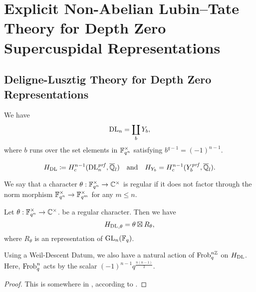 \documentclass[../main.tex]{subfiles}
\begin{document}
\section{Explicit Non-Abelian Lubin--Tate Theory for Depth Zero Supercuspidal
Representations} %
\label{sec:Explicit Non-Abelian Lubin-Tate Theory for Depth Zero Supercuspidal Representations}


\subsection{Deligne-Lusztig Theory for Depth Zero Representations} %
\label{sub:Deligne-Lusztig Theory for Depth Zero Representations}
\begin{defi}\label{def:DLVariety}
  \todo{}
\end{defi}

\begin{lem}
  We have $$\mathrm{DL}_n = \coprod_{b} Y_b,$$
  where $b$ runs over the set elements in $\mathbb{F}_{q^n}^\times$ satisfying 
  $b^{q-1} = (-1)^{n-1}$. 
\end{lem}

\begin{equation} \label{eq:defDLCohom}
  H_\mathrm{DL} \coloneqq H^{n-1}_c(\mathrm{DL}_n^{\mathit{prf}}, \overline {\mathbb{Q}}_l) \quad \text{and} \quad
  H_{Y_b} = H^{n-1}_c(Y_b^{\mathit{prf}}, \overline {\mathbb{Q}}_l).
\end{equation}

\begin{defi}
  We say that a character $\theta: \mathbb{F}_{q^n}^\times \to \mathbb{C}^\times$ is 
  regular if it does not factor through the norm morphism
  $\mathbb{F}_{q^n}^\times \to \mathbb{F}_{q^m}^\times$ for any $m \leq n$.
\end{defi}

\begin{defi} \label{def:DLCorrespondence}
  Let $\theta: \mathbb{F}_{q^n}^\times \to \mathbb{C}^\times$. be a regular character.
  Then we have 
  \begin{equation*}
    {H_\mathrm{DL}}_{, \theta} = \theta \boxtimes R_\theta,
  \end{equation*}
  where $R_\theta$ is an  representation of $\operatorname{GL}_n(\mathbb{F}_q)$. 
\end{defi}

\begin{prop}
  Using a  Weil-Descent Datum, we also have a natural
  action of $\operatorname{Frob}_q^{n\mathbb{Z}}$ on $H_\mathrm{DL}$. Here, $\operatorname{Frob}_q^n$ acts by the scalar
  $(-1)^{n-1} q^{\frac{n(n-1)}2}$. 
  \begin{proof}
    This is somewhere in \cite{digne1985fonctions}, according to \cite[Lemma
    5.10]{mieda2016geometric}.
  \end{proof}
\end{prop}
\end{document}
